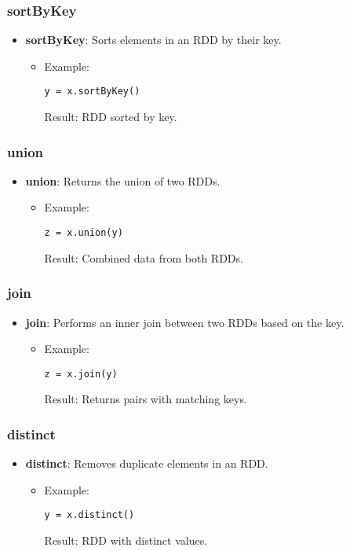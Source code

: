 \documentclass[12pt]{article}
\begin{document}
\subsubsection*{sortByKey}
\begin{itemize}
    \item \textbf{sortByKey}: Sorts elements in an RDD by their key.
    \begin{itemize}
        \item Example:
        \begin{verbatim}
y = x.sortByKey()
        \end{verbatim}
        Result: RDD sorted by key.
    \end{itemize}
\end{itemize}

\subsubsection*{union}
\begin{itemize}
    \item \textbf{union}: Returns the union of two RDDs.
    \begin{itemize}
        \item Example:
        \begin{verbatim}
z = x.union(y)
        \end{verbatim}
        Result: Combined data from both RDDs.
    \end{itemize}
\end{itemize}

\subsubsection*{join}
\begin{itemize}
    \item \textbf{join}: Performs an inner join between two RDDs based on the key.
    \begin{itemize}
        \item Example:
        \begin{verbatim}
z = x.join(y)
        \end{verbatim}
        Result: Returns pairs with matching keys.
    \end{itemize}
\end{itemize}

\subsubsection*{distinct}
\begin{itemize}
    \item \textbf{distinct}: Removes duplicate elements in an RDD.
    \begin{itemize}
        \item Example:
        \begin{verbatim}
y = x.distinct()
        \end{verbatim}
        Result: RDD with distinct values.
    \end{itemize}
\end{itemize}
\end{document}
